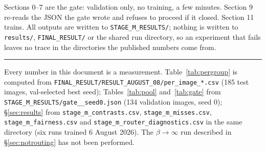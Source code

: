 \documentclass[11pt,a4paper]{article}
\begin{document}
Sections 0--7 are the gate: validation only, no training, a few minutes. Section 9
re-reads the JSON the gate wrote and refuses to proceed if it closed. Section 11
trains. All outputs are written to \texttt{STAGE\_M\_RESULTS/}; nothing is written
to \texttt{results/}, \texttt{FINAL\_RESULT/} or the shared run directory, so an
experiment that fails leaves no trace in the directories the published numbers
come from.

\vspace{4mm}
\hrule
\vspace{2mm}
\footnotesize
\noindent
Every number in this document is a measurement. Table~\ref{tab:pergroup} is
computed from \texttt{FINAL\_RESULT/RESULT\_AUGUST\_08/per\_image\_*.csv} (185
test images, val-selected best seed); Tables~\ref{tab:pool} and~\ref{tab:gate}
from \texttt{STAGE\_M\_RESULTS/gate\_\_seed0.json} (134 validation images, seed
0); \S\ref{sec:results} from \texttt{stage\_m\_contrasts.csv},
\texttt{stage\_m\_misses.csv}, \texttt{stage\_m\_fairness.csv} and
\texttt{stage\_m\_router\_diagnostics.csv} in the same directory (six runs
trained 6 August 2026). The $\beta \to \infty$ run described in
\S\ref{sec:notrouting} has not been performed.
\end{document}
